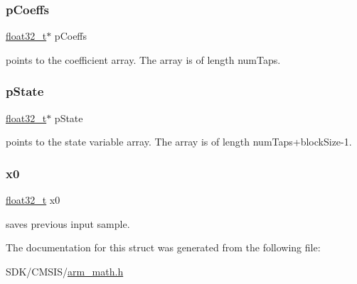 \subsubsection{\texorpdfstring{p\+Coeffs}{pCoeffs}}
{\footnotesize\ttfamily \mbox{\hyperlink{arm__math_8h_a4611b605e45ab401f02cab15c5e38715}{float32\+\_\+t}}$\ast$ p\+Coeffs}

points to the coefficient array. The array is of length num\+Taps. \mbox{\label{structarm__lms__norm__instance__f32_a335c87e6fdc4b96601d95a5de8b9c463}} 
\subsubsection{\texorpdfstring{p\+State}{pState}}
{\footnotesize\ttfamily \mbox{\hyperlink{arm__math_8h_a4611b605e45ab401f02cab15c5e38715}{float32\+\_\+t}}$\ast$ p\+State}

points to the state variable array. The array is of length num\+Taps+block\+Size-\/1. \mbox{\label{structarm__lms__norm__instance__f32_ab56b6f83c5b324c3ef620474b6e5a6e1}} 
\subsubsection{\texorpdfstring{x0}{x0}}
{\footnotesize\ttfamily \mbox{\hyperlink{arm__math_8h_a4611b605e45ab401f02cab15c5e38715}{float32\+\_\+t}} x0}

saves previous input sample. 

The documentation for this struct was generated from the following file\+:\begin{DoxyCompactItemize}
\item 
S\+D\+K/\+C\+M\+S\+I\+S/\mbox{\hyperlink{arm__math_8h}{arm\+\_\+math.\+h}}\end{DoxyCompactItemize}
